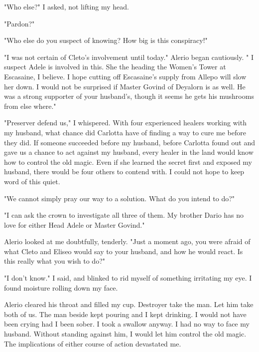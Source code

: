 \documentclass{article}
\begin{document}
"Who else?" I asked, not lifting my head.

"Pardon?"

"Who else do you suspect of knowing? How big is this conspiracy!"

"I was not certain of Cleto's involvement until today." Alerio began cautiously. " I suspect Adele is involved in this. She the heading the Women's Tower at Escasaine, I believe. I hope cutting off Escasaine's supply from Allepo will slow her down. I would not be surprised if Master Govind of Deyalorn is as well. He was a strong supporter of your husband's, though it seems he gets his mushrooms from else where."

"Preserver defend us," I whispered. With four experienced healers working with my husband, what chance did Carlotta have of finding a way to cure me before they did. If someone succeeded before my husband, before Carlotta found out and gave us a chance to act against my husband, every healer in the land would know how to control the old magic. Even if she learned the secret first and exposed my husband, there would be four others to contend with. I could not hope to keep word of this quiet.

"We cannot simply pray our way to a solution. What do you intend to do?"

"I can ask the crown to investigate all three of them. My brother Dario has no love for either Head Adele or Master Govind."

Alerio looked at me doubtfully, tenderly. "Just a moment ago, you were afraid of what Cleto and Eliseo would say to your husband, and how he would react. Is this really what you wish to do?"

"I don't know." I said, and blinked to rid myself of something irritating my eye. I found moisture rolling down my face.

Alerio cleared his throat and filled my cup. Destroyer take the man. Let him take both of us. The man beside kept pouring and I kept drinking. I would not have been crying had I been sober. I took a swallow anyway. I had no way to face my husband. Without standing against him, I would let him control the old magic. The implications of either course of action devastated me.
\end{document}
